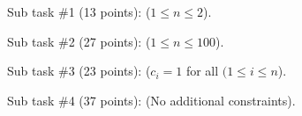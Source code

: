 Sub task \#1 (13 points): ($1 \leq n \leq 2$).

Sub task \#2 (27 points): ($1 \leq n \leq 100$).

Sub task \#3 (23 points): ($c_i = 1$ for all $(1 \le i \le n$).

Sub task \#4 (37 points): (No additional constraints).